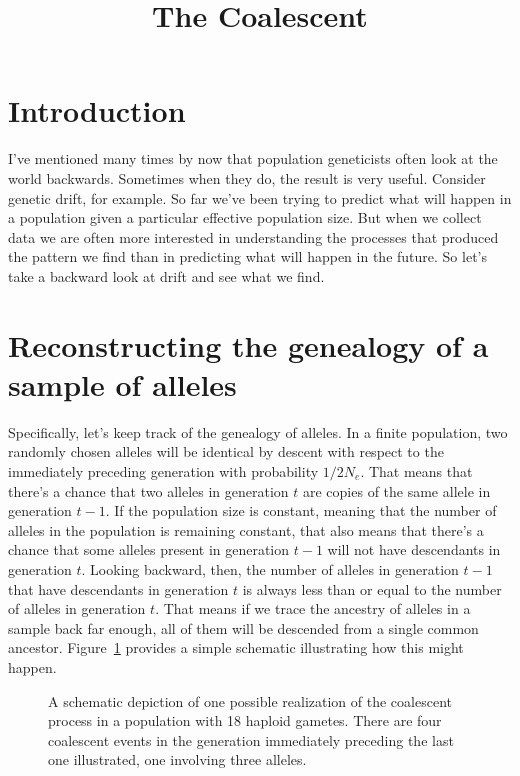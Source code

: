 \documentclass[12pt]{article}
\title{The Coalescent}
\begin{document}
\maketitle

\thispagestyle{first}

\section*{Introduction}

I've mentioned many times by now that population geneticists often
look at the world backwards. Sometimes when they do, the result is
very useful. Consider genetic drift, for example. So far we've been
trying to predict what will happen in a population given a particular
effective population size. But when we collect data we are often more
interested in understanding the processes that produced the pattern we
find than in predicting what will happen in the future. So let's take
a backward look at drift and see what we find.


\section*{Reconstructing the genealogy of a sample of
  alleles}

Specifically, let's keep track of the genealogy of alleles. In a
finite population, two randomly chosen alleles will be identical by
descent with respect to the immediately preceding generation with
probability $1/2N_e$. That means that there's a chance that two
alleles in generation $t$ are copies of the same allele in generation
$t-1$. If the population size is constant, meaning that the number of
alleles in the population is remaining constant, that also means that
there's a chance that some alleles present in generation $t-1$ will
not have descendants in generation $t$. Looking backward, then, the
number of alleles in generation $t-1$ that have descendants in
generation $t$ is always less than or equal to the number of alleles
in generation $t$. That means if we trace the ancestry of alleles in a
sample back far enough, all of them will be descended from a single
common ancestor. Figure~\ref{fig:coalescent} provides a simple
schematic illustrating how this might happen.

\begin{figure}
\begin{center}
\end{center}
\caption{A schematic depiction of one possible realization of the
  coalescent process in a population with 18 haploid gametes. There
  are four coalescent events in the generation immediately preceding
  the last one illustrated, one involving three alleles.}\label{fig:coalescent}
\end{figure}
\end{document}

